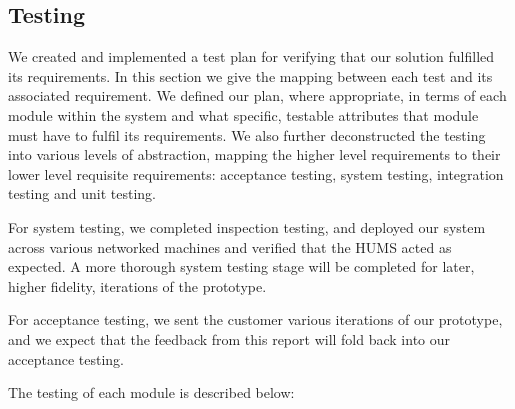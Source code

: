 \documentclass[10pt,a4paper]{article}
\begin{document}
\subsection{Testing} 
We created and implemented a test plan for verifying that our solution fulfilled its
requirements. In this section we give the mapping between each
test and its associated requirement. We
defined our plan, where appropriate, in terms of each module within
the system and what specific, testable attributes that module must
have to fulfil its requirements. We also further deconstructed the
testing into various levels of abstraction, mapping the higher level
requirements to their lower level requisite requirements: acceptance
testing, system testing, integration testing and unit
testing.

For system testing, we completed inspection testing, and deployed our system across various networked machines and verified that the HUMS acted as expected. A more thorough system testing stage will be completed for later, higher fidelity, iterations of the prototype.

For acceptance testing, we sent the customer various iterations of our prototype, and we expect that the feedback from this report will fold back into our acceptance testing.

The testing of each module is described below:
\end{document}
